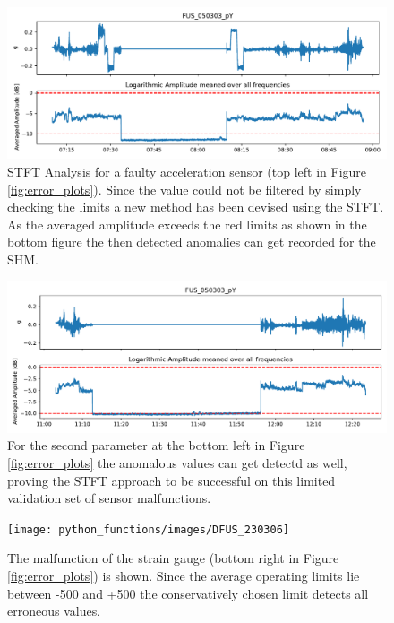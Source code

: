 \begin{figure}
    \centering
    \includegraphics[width=\textwidth]{03_figures/python_functions/images/FUS_050303}
    \caption[Using STFT and averaging to detect errors in Level 2]{STFT Analysis for a faulty acceleration sensor (top left in Figure \ref{fig:error_plots}).
    Since the value could not be filtered by simply checking the limits a new method has been devised using the STFT. As the averaged amplitude exceeds the red limits as shown in the bottom figure the then detected anomalies can get recorded for the SHM.}
    \label{fig:results_050303_1}
\end{figure}


\begin{figure}
    \centering
    \includegraphics[width=\textwidth]{03_figures/python_functions/images/FUS_050303_2}
    \caption[Using STFT on bottom left sensor from Figure \ref{fig:error_plots}]{For the second parameter at the bottom left in Figure \ref{fig:error_plots} the anomalous values can get detectd as well, proving the STFT approach to be successful on this limited validation set of sensor malfunctions.}
    \label{fig:results_050303_2}
\end{figure}


\begin{figure}
    \centering
    \texttt{[image: python\_functions/images/DFUS\_230306]}
    \caption[Malfunction of the Strain Gauge]{The malfunction of the strain gauge (bottom right in Figure \ref{fig:error_plots}) is shown. Since the average operating limits lie between -500 and +500 the conservatively chosen limit detects all erroneous values.}
    \label{fig:results_230306}
\end{figure}

